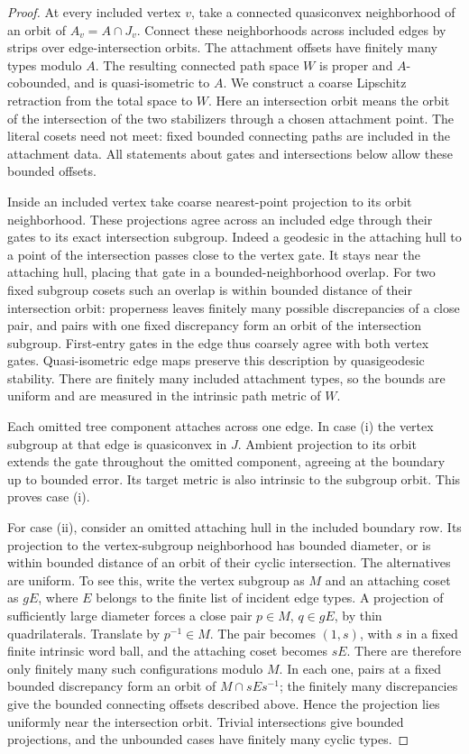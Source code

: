 \begin{proof}
At every included vertex \(v\), take a connected quasiconvex
neighborhood of an orbit of \(A_v=A\cap J_v\). Connect these
neighborhoods across included edges by strips over edge-intersection
orbits. The attachment offsets have finitely many types modulo \(A\).
The resulting connected path space \(W\) is proper and \(A\)-cobounded,
and is quasi-isometric to \(A\). We construct a coarse Lipschitz
retraction from the total space to \(W\).
Here an intersection orbit means the orbit of the intersection of
the two stabilizers through a chosen attachment point. The literal
cosets need not meet: fixed bounded connecting paths are included
in the attachment data. All statements about gates and intersections
below allow these bounded offsets.

Inside an included vertex take coarse nearest-point projection to
its orbit neighborhood. These projections agree across an included
edge through their gates to its exact intersection subgroup.
Indeed a geodesic in the attaching hull to a point of the intersection
passes close to the vertex gate. It stays near the attaching hull,
placing that gate in a bounded-neighborhood overlap.
For two fixed subgroup cosets such an overlap is within bounded
distance of their intersection orbit: properness leaves finitely many
possible discrepancies of a close pair, and pairs with one fixed
discrepancy form an orbit of the intersection subgroup.
First-entry gates in the edge thus coarsely agree with both vertex
gates. Quasi-isometric edge maps preserve this description by
quasigeodesic stability. There are finitely many included attachment
types, so the bounds are uniform and are measured in the intrinsic
path metric of \(W\).

Each omitted tree component attaches across one edge. In case (i)
the vertex subgroup at that edge is quasiconvex in \(J\).
Ambient projection to its orbit extends the gate throughout the
omitted component, agreeing at the boundary up to bounded error.
Its target metric is also intrinsic to the subgroup orbit. This
proves case (i).

For case (ii), consider an omitted attaching hull in the included
boundary row. Its projection to the vertex-subgroup neighborhood
has bounded diameter, or is within bounded distance of an orbit of
their cyclic intersection. The alternatives are uniform. To see
this, write the vertex subgroup as \(M\) and an attaching coset as
\(gE\), where \(E\) belongs to the finite list of incident edge
types. A projection of sufficiently large diameter forces a close
pair \(p\in M\), \(q\in gE\), by thin quadrilaterals. Translate by
\(p^{-1}\in M\). The pair becomes \((1,s)\), with \(s\) in a fixed
finite intrinsic word ball, and the attaching coset becomes \(sE\).
There are therefore only finitely many such configurations modulo
\(M\). In each one, pairs at a fixed bounded discrepancy form an
orbit of \(M\cap sEs^{-1}\); the finitely many discrepancies give
the bounded connecting offsets described above. Hence the projection
lies uniformly near the intersection orbit. Trivial intersections
give bounded projections, and the unbounded cases have finitely
many cyclic types.


\end{proof}
